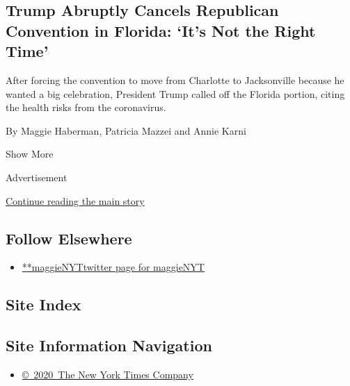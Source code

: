 \begin{enumerate}
{  \subsection{Trump Abruptly Cancels Republican Convention in Florida:
  `It's Not the Right
  Time'}\label{trump-abruptly-cancels-republican-convention-in-florida-its-not-the-right-time}}

  After forcing the convention to move from Charlotte to Jacksonville
  because he wanted a big celebration, President Trump called off the
  Florida portion, citing the health risks from the coronavirus.

  By Maggie Haberman, Patricia Mazzei and Annie Karni
\end{enumerate}

Show More

Advertisement

\protect\hyperlink{after-mid2}{Continue reading the main story}

\hypertarget{follow-elsewhere}{%
\subsection{Follow Elsewhere}\label{follow-elsewhere}}

\begin{itemize}
\tightlist
\item
  \href{https://twitter.com/maggieNYT}{**maggieNYTtwitter page for
  maggieNYT}
\end{itemize}

\hypertarget{site-index}{%
\subsection{Site Index}\label{site-index}}

\hypertarget{site-information-navigation}{%
\subsection{Site Information
Navigation}\label{site-information-navigation}}

\begin{itemize}
\tightlist
\item
  \href{https://help.nytimes.com/hc/en-us/articles/115014792127-Copyright-notice}{©~2020~The
  New York Times Company}
\end{itemize}

